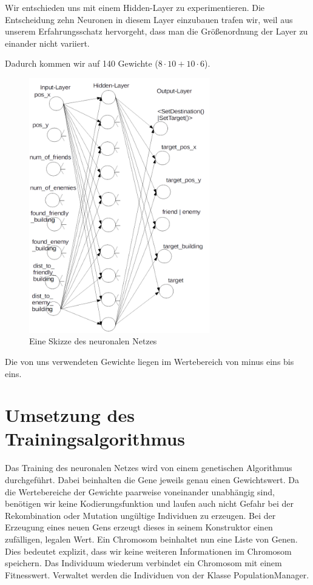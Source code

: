 \documentclass[
	12pt,
	a4paper,
	BCOR10mm,
	DIV14,
	headsepline,
	usegeometry,
]{scrreprt}
\begin{document}
Wir entschieden uns mit einem Hidden-Layer zu experimentieren.
Die Entscheidung zehn Neuronen in diesem Layer einzubauen trafen wir, weil aus unserem Erfahrungsschatz hervorgeht, dass man die Größenordnung der Layer zu einander nicht variiert.

Dadurch kommen wir auf 140 Gewichte ($8 \cdot 10 + 10 \cdot 6$).

\begin{figure}[h!]
	\centering
	\includegraphics[width = 0.7\textwidth]{VisualisierungNN.png}
	\caption{Eine Skizze des neuronalen Netzes}
	\label{NN}
\end{figure}

Die von uns verwendeten Gewichte liegen im Wertebereich von minus eins bis eins.

\section{Umsetzung des Trainingsalgorithmus}
Das Training des neuronalen Netzes wird von einem genetischen Algorithmus durchgeführt.
Dabei beinhalten die Gene jeweils genau einen Gewichtswert.
Da die Wertebereiche der Gewichte paarweise voneinander unabhängig sind, benötigen wir keine Kodierungsfunktion und laufen auch nicht Gefahr bei der Rekombination oder Mutation ungültige Individuen zu erzeugen.
Bei der Erzeugung eines neuen Gens erzeugt dieses in seinem Konstruktor einen zufälligen, legalen Wert.
Ein Chromosom beinhaltet nun eine Liste von Genen.
Dies bedeutet explizit, dass wir keine weiteren Informationen im Chromosom speichern.
Das Individuum wiederum verbindet ein Chromosom mit einem Fitnesswert.
Verwaltet werden die Individuen von der Klasse PopulationManager.
\end{document}
